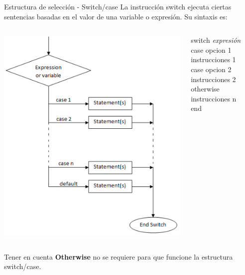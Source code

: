 \documentclass{bredelebeamer}
\begin{document}
\begin{frame}{Estructura de selección - Switch/case}
La instrucción switch ejecuta ciertas sentencias basadas en el valor de una
variable o expresión. Su sintaxis es:
\begin{columns}
\begin{column}{0.5\textwidth}
\begin{center}
\includegraphics[scale=0.2]{images/pantalla7.png}
\end{center}
\end{column}
\begin{column}{0.5\textwidth}
switch \textit{expresión}\\
   case opcion 1\\
      instrucciones 1\\
   case opcion 2\\
      instrucciones 2\\
   otherwise
      instrucciones n\\
end
\end{column}
\end{columns}

\begin{block}{Tener en cuenta}
\textbf{Otherwise} no se requiere para que funcione la estructura switch/case.
\end{block}
\end{frame}
\end{document}
